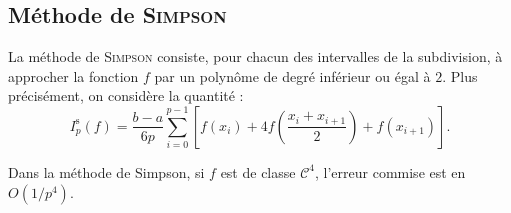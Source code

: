 \subsection{Méthode de \textsc{Simpson}}

La méthode de \textsc{Simpson} consiste, pour chacun des intervalles de la subdivision, à approcher la fonction $f$ par un polynôme de degré inférieur ou égal à $2$. Plus précisément, on considère la quantité :
\[
I_p^\mathrm{s}(f) = \frac{b-a}{6 p} \sum_{i=0}^{p-1} \left[f(x_i)+ 4 f\left(\frac{x_i + x_{i+1}}{2}\right) + f(x_{i+1})\right].
\]

\begin{prop}{}{}
Dans la méthode de Simpson, si $f$ est de classe $\mathscr{C}^4$, l'erreur commise est en $O(1/p^4)$.
\end{prop}

